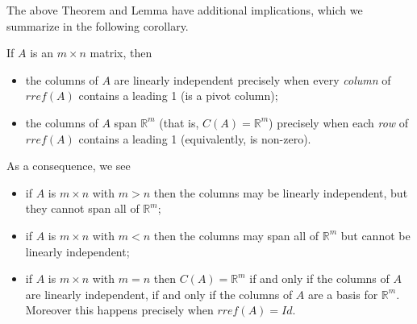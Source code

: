 \documentclass{ximera}
\begin{document}
The above Theorem and Lemma have additional implications, which we summarize in the following corollary.


\begin{corollary}If $A$ is an $m\times n$ matrix, then 
\begin{itemize}
\item the columns of $A$ are linearly independent precisely when every {\it column} of $rref(A)$ contains a leading 1 (is a pivot column);
\item the columns of $A$ span $\mathbb R^m$ (that is, $C(A) = \mathbb R^m$) precisely when each {\it row} of $rref(A)$ contains a leading 1 (equivalently, is non-zero).
\end{itemize}
As a consequence, we see
\begin{itemize}
\item if $A$ is $m\times n$ with $m > n$ then the columns may be linearly independent, but they cannot span all of $\mathbb R^m$;
\item if $A$ is $m\times n$ with $m < n$ then the columns may span all of $\mathbb R^m$ but cannot be linearly independent;
\item if $A$ is $m\times n$ with $m = n$ then $C(A) = \mathbb R^m$ if and only if the columns of $A$ are linearly independent, if and only if the columns of $A$ are a basis for $\mathbb R^m$. Moreover this happens precisely when $rref(A) = Id$.
\end{itemize}
\end{corollary}
\end{document}
